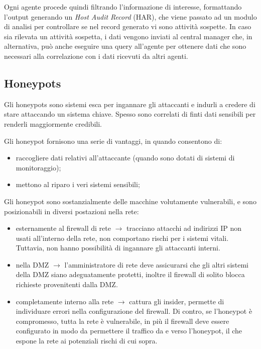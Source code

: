 \documentclass[a4paper, 10pt, twoside]{article}
\begin{document}
	Ogni agente procede quindi filtrando l'informazione di interesse, formattando l'output generando un \textit{Host Audit Record} (HAR), che viene passato ad un modulo di analisi per controllare se nel record generato vi sono attività sospette. In caso sia rilevata un attività sospetta, i dati vengono inviati al central manager che, in alternativa, può anche eseguire una query all'agente per ottenere dati che sono necessari alla correlazione con i dati ricevuti da altri agenti.

	\subsection{Honeypots}
	Gli honeypots sono sistemi esca per ingannare gli attaccanti e indurli a credere di stare attaccando un sistema chiave. Spesso sono correlati di finti dati sensibili per renderli maggiormente credibili. 

	Gli honeypot fornisono una serie di vantaggi, in quando consentono di:\begin{itemize}
		\item raccogliere dati relativi all'attaccante (quando sono dotati di sistemi di monitoraggio);
		\item mettono al riparo i veri sistemi sensibili;
	\end{itemize}

	Gli honeypot sono sostanzialmente delle macchine volutamente vulnerabili, e sono posizionabili in diversi postazioni nella rete: \begin{itemize}
		\item esternamente al firewall di rete $\rightarrow$ tracciano attacchi ad indirizzi IP non usati all'interno della rete, non comportano rischi per i sistemi vitali. Tuttavia, non hanno possibilità di ingannare gli attaccanti interni.
		\item nella DMZ $\rightarrow$ l'amministratore di rete deve assicurarsi che gli altri sistemi della DMZ siano adeguatamente protetti, inoltre il firewall di solito blocca richieste provenitenti dalla DMZ.
		\item completamente interno alla rete $\rightarrow$ cattura gli insider, permette di individuare errori nella configurazione del firewall. Di contro, se l'honeypot è compromesso, tutta la rete è vulnerabile, in più il firewall deve essere configurato in modo da permettere il traffico da e verso l'honeypot, il che espone la rete ai potenziali rischi di cui sopra.
	\end{itemize}
\end{document}
